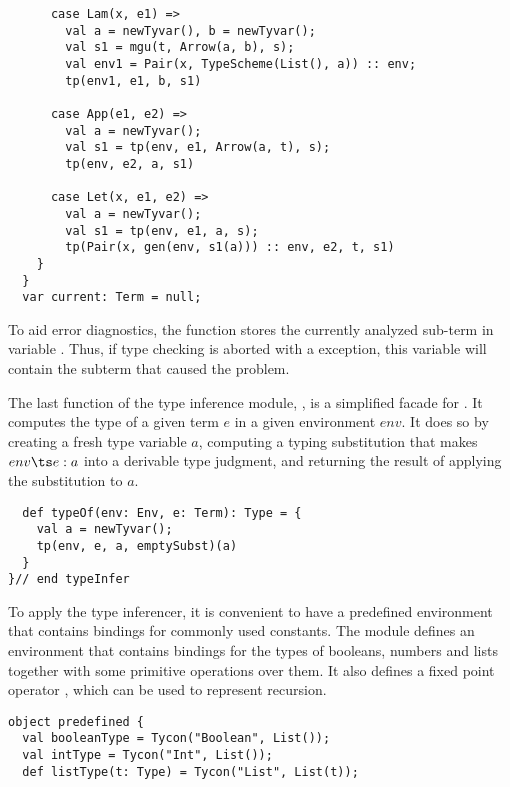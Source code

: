 \documentclass[a4paper,12pt,twoside,titlepage]{book}
\begin{document}
{\begin{lstlisting}
      case Lam(x, e1) =>
        val a = newTyvar(), b = newTyvar();
        val s1 = mgu(t, Arrow(a, b), s);
        val env1 = Pair(x, TypeScheme(List(), a)) :: env;
        tp(env1, e1, b, s1)

      case App(e1, e2) =>
        val a = newTyvar();
        val s1 = tp(env, e1, Arrow(a, t), s);
        tp(env, e2, a, s1)

      case Let(x, e1, e2) =>
        val a = newTyvar();
        val s1 = tp(env, e1, a, s);
        tp(Pair(x, gen(env, s1(a))) :: env, e2, t, s1)
    }
  } 
  var current: Term = null;
\end{lstlisting}
To aid error diagnostics, the  function stores the currently
analyzed sub-term in variable . Thus, if type checking
is aborted with a  exception, this variable will
contain the subterm that caused the problem.

The last function of the type inference module, , is a
simplified facade for . It computes the type of a given term
$e$ in a given environment $env$. It does so by creating a fresh type
variable $a$, computing a typing substitution that makes $env \ts e: a$
into a derivable type judgment, and returning
the result of applying the substitution to $a$.
\begin{lstlisting}
  def typeOf(env: Env, e: Term): Type = {
    val a = newTyvar();
    tp(env, e, a, emptySubst)(a)
  }
}// end typeInfer
\end{lstlisting}
To apply the type inferencer, it is convenient to have a predefined
environment that contains bindings for commonly used constants. The
module  defines an environment  that
contains bindings for the types of booleans, numbers and lists
together with some primitive operations over them. It also
defines a fixed point operator , which can be used to
represent recursion.
\begin{lstlisting}
object predefined {
  val booleanType = Tycon("Boolean", List());
  val intType = Tycon("Int", List());
  def listType(t: Type) = Tycon("List", List(t));


\end{lstlisting}}
\end{document}
